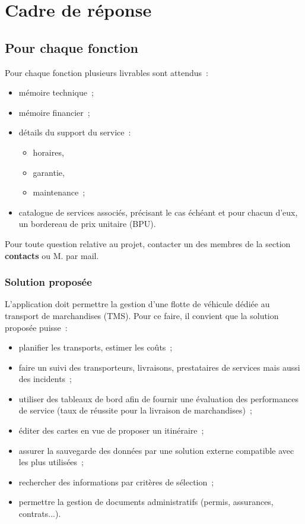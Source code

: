 \chapter{Cadre de réponse}

\section{Pour chaque fonction}
Pour chaque fonction plusieurs livrables sont attendus~:
\begin{itemize}
	\item mémoire technique~;
	\item mémoire financier~;
	\item détails du support du service~:
	\begin{itemize}
		\item horaires,
		\item garantie,
		\item maintenance~;
	\end{itemize}
	\item catalogue de services associés, précisant le cas échéant et pour chacun d'eux, un bordereau de prix unitaire (BPU).
\end{itemize}
Pour toute question relative au projet, contacter un des membres de la section \textbf{contacts} ou M. \roland par mail.

\subsection{Solution proposée}
L'application doit permettre la gestion d'une flotte de véhicule dédiée au transport de marchandises (TMS). Pour ce faire, il convient que la solution proposée puisse~:
\begin{itemize}
	\item planifier les transports, estimer les coûts~;
	\item faire un suivi des transporteurs, livraisons, prestataires de services mais aussi des incidents~;
	\item utiliser des tableaux de bord afin de fournir une évaluation des performances de service (taux  de réussite pour la livraison de marchandises)~;
	\item éditer des cartes en vue de proposer un itinéraire~;
	\item assurer la sauvegarde des données par une solution externe compatible avec les plus utilisées~;
	\item rechercher des informations par critères de sélection~;
	\item permettre la gestion de documents administratifs (permis, assurances, contrats...).
\end{itemize}

